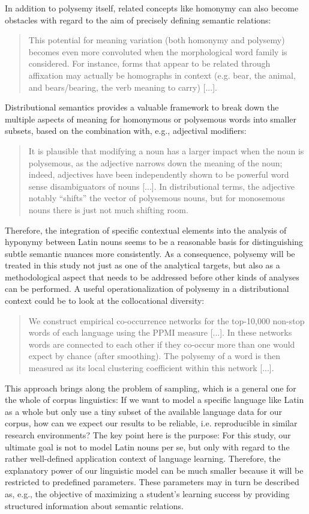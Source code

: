 \documentclass[jou]{apa6} %
\begin{document}
In addition to polysemy itself, related concepts like homonymy can also become obstacles with regard to the aim of precisely defining semantic relations:
\blockquote[{\cite[p.~251]{gardnerValidatingConstructWord2007}}]{This potential for meaning variation (both homonymy and polysemy) becomes even more convoluted when the morphological word family is considered. For instance, forms that appear to be related through affixation may actually be homographs in context (e.g. bear, the animal, and bears/bearing, the verb meaning to carry) [...].}
Distributional semantics provides a valuable framework to break down the multiple aspects of meaning for homonymous or polysemous words into smaller subsets, based on the combination with, e.g., adjectival modifiers:
\blockquote[{\cite[p.~42]{boledaIntensionalityWasOnly2013}}]{It is plausible that modifying a noun has a larger impact when the noun is polysemous, as the adjective narrows down the meaning of the noun; indeed, adjectives have been independently shown to be powerful word sense disambiguators of nouns [...]. In distributional terms, the adjective notably “shifts” the vector of polysemous nouns, but for monosemous nouns there is just not much shifting room.}
Therefore, the integration of specific contextual elements into the analysis of hyponymy between Latin nouns seems to be a reasonable basis for distinguishing subtle semantic nuances more consistently. As a consequence, polysemy will be treated in this study not just as one of the analytical targets, but also as a methodological aspect that needs to be addressed before other kinds of analyses can be performed. A useful operationalization of polysemy in a distributional context could be to look at the collocational diversity:
\blockquote[{\cite[p.~8]{hamiltonDiachronicWordEmbeddings2016}}]{We construct empirical co-occurrence networks for the top-10,000 non-stop words of each language using the PPMI measure [...]. In these networks words are connected to each other if they co-occur more than one would expect by chance (after smoothing). The polysemy of a word is then measured as its local clustering coefficient within this network [...].}
This approach brings along the problem of sampling, which is a general one for the whole of corpus linguistics: If we want to model a specific language like Latin as a whole but only use a tiny subset of the available language data for our corpus, how can we expect our results to be reliable, i.e. reproducible in similar research environments? The key point here is the purpose: For this study, our ultimate goal is not to model Latin nouns per se, but only with regard to the rather well-defined application context of language learning. Therefore, the explanatory power of our linguistic model can be much smaller because it will be restricted to predefined parameters. These parameters may in turn be described as, e.g., the objective of maximizing a student's learning success by providing structured information about semantic relations.
\end{document}
